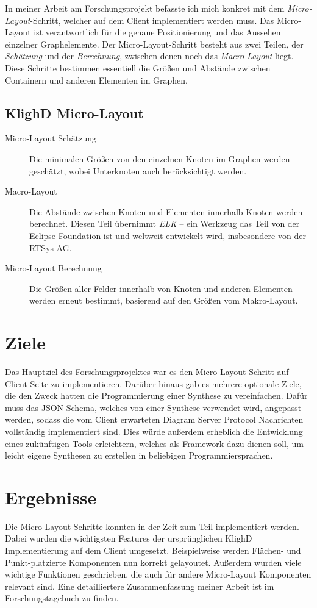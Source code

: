     In meiner Arbeit am Forschungsprojekt befasste ich mich konkret mit dem \emph{Micro-Layout}-Schritt, welcher auf dem Client implementiert werden muss.
    Das Micro-Layout ist verantwortlich für die genaue Positionierung und das Aussehen einzelner Graphelemente.
    Der Micro-Layout-Schritt besteht aus zwei Teilen, der \emph{Schätzung} und der \emph{Berechnung}, zwischen denen noch das \emph{Macro-Layout} liegt.
    Diese Schritte bestimmen essentiell die Größen und Abstände zwischen Containern und anderen Elementen im Graphen.
    
    \subsection{KlighD Micro-Layout}
    \begin{description}
        \item[Micro-Layout Schätzung] Die minimalen Größen von den einzelnen Knoten im Graphen werden geschätzt, wobei Unterknoten auch berücksichtigt werden.

        \item[Macro-Layout] Die Abstände zwischen Knoten und Elementen innerhalb Knoten werden berechnet.
            Diesen Teil übernimmt \emph{ELK} -- ein Werkzeug das Teil von der Eclipse Foundation ist und weltweit entwickelt wird, insbesondere von der RTSys AG.

        \item[Micro-Layout Berechnung] Die Größen aller Felder innerhalb von Knoten und anderen Elementen werden erneut bestimmt, basierend auf den Größen vom Makro-Layout.
    \end{description}

    \section{Ziele}
    Das Hauptziel des Forschungsprojektes war es den Micro-Layout-Schritt auf Client Seite zu implementieren.
    Darüber hinaus gab es mehrere optionale Ziele, die den Zweck hatten die Programmierung einer Synthese zu vereinfachen.
    Dafür muss das JSON Schema, welches von einer Synthese verwendet wird, angepasst werden, sodass die vom Client erwarteten Diagram Server Protocol Nachrichten vollständig implementiert sind.
    Dies würde außerdem erheblich die Entwicklung eines zukünftigen Tools erleichtern, welches als Framework dazu dienen soll, um leicht eigene Synthesen zu erstellen in beliebigen Programmiersprachen.

    \section{Ergebnisse}
    Die Micro-Layout Schritte konnten in der Zeit zum Teil implementiert werden.
    Dabei wurden die wichtigsten Features der ursprünglichen KlighD Implementierung auf dem Client umgesetzt.
    Beispielweise werden Flächen- und Punkt-platzierte Komponenten nun korrekt gelayoutet.
    Außerdem wurden viele wichtige Funktionen geschrieben, die auch für andere Micro-Layout Komponenten relevant sind.
    Eine detailliertere Zusammenfassung meiner Arbeit ist im Forschungstagebuch zu finden.
    
